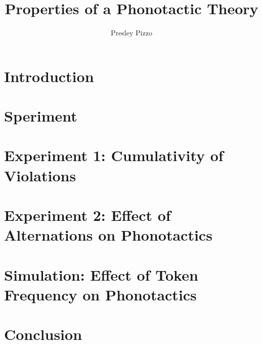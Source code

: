 \documentclass{report} %
\author{Presley Pizzo}
\title{Properties of a Phonotactic Theory}
\begin{document}
\maketitle

\chapter{Introduction}


\chapter{Speriment}


\chapter{Experiment 1: Cumulativity of Violations}


\chapter{Experiment 2: Effect of Alternations on Phonotactics}


\chapter{Simulation: Effect of Token Frequency on Phonotactics}


\chapter{Conclusion}




\end{document}
